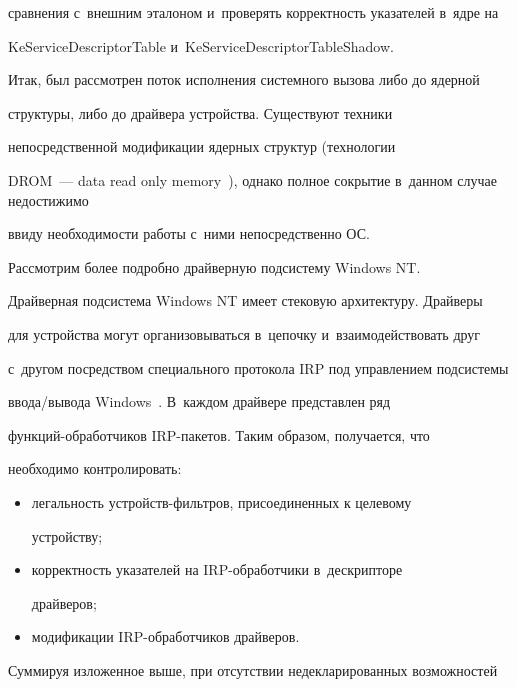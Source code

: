 сравнения с~внешним эталоном и~проверять корректность указателей в~ядре на 


{\sf KeServiceDescriptorTable} и~{\sf KeServiceDescriptorTableShadow}.


  


  Итак, был рассмотрен поток исполнения системного вызова либо до ядерной 


структуры, либо до драйвера устройства. Существуют техники 


непосредственной модификации ядерных структур (технологии 


DROM~--- data read only memory~\cite{12-g}), однако полное сокрытие в~данном случае недостижимо 


ввиду необходимости работы с~ними непосредственно ОС. 


Рассмотрим более подробно драйверную подсистему Windows NT.


  


  Драйверная подсистема Windows NT имеет стековую архитектуру. Драйверы 


для устройства могут организовываться в~цепочку и~взаимодействовать друг 


с~другом посредством специального протокола IRP под управлением подсистемы 


ввода/вывода Windows~\cite{10-g}. В~каждом драйвере представлен ряд 


функ\-ций-обработчиков IRP-па\-ке\-тов. Таким образом, получается, что 


необходимо контролировать:


  \begin{itemize}


\item легальность устройств-фильт\-ров, присоединенных к целевому 


устройству;


\item корректность указателей на IRP-обра\-бот\-чи\-ки в~дескрипторе 


драйверов;


\item модификации IRP-обработчиков драйверов.


\end{itemize}





  Суммируя изложенное выше, при отсутствии недекларированных возможностей 



